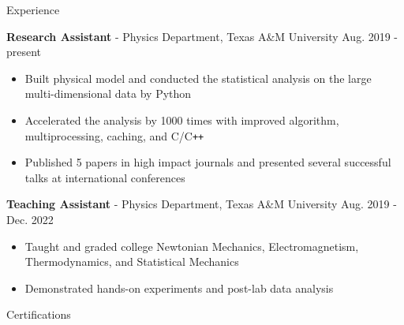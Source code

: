 \documentclass{resume}
\begin{document}
\begin{rSection}{Experience}
    \item \textbf{Research Assistant} - Physics Department, Texas A\&M University \hfill Aug. 2019 - present
        \begin{itemize}
        \item Built physical model and conducted the statistical analysis on the large multi-dimensional data by Python
        \item Accelerated the analysis by 1000 times with improved algorithm, multiprocessing, caching, and C/C\texttt{++}
        \item Published 5 papers in high impact journals and presented several successful talks at international conferences
        \end{itemize}

    \item \textbf{Teaching Assistant} - Physics Department, Texas A\&M University \hfill Aug. 2019 - Dec. 2022
        \begin{itemize}
        \item Taught and graded college Newtonian Mechanics, Electromagnetism, Thermodynamics, and Statistical Mechanics
        \item Demonstrated hands-on experiments and post-lab data analysis
        \end{itemize}
\end{rSection}

\vspace{-0.25em}
\begin{rSection}{Certifications}
    \vspace{-1.2em}
    \item \href{https://www.coursera.org/account/accomplishments/verify/N4T4JR8XLU3Z}{\color{black}{~~~-~~Machine Learning Foundations: Algorithmic Foundations}} \vspace{-0.5em}
    \item \href{https://www.coursera.org/account/accomplishments/verify/4X4TD24NFAY4}{\color{black}{~~~-~~Machine Learning Foundations: Mathematical Foundations}} \vspace{-0.5em}
    \item \href{https://www.coursera.org/account/accomplishments/verify/TJKKSPN42ZEE}{\color{black}{~~~-~~Machine Learning Techniques}} \vspace{-0.5em}
    \item \href{https://www.coursera.org/account/accomplishments/verify/KHCRSS4J4TZE}{\color{black}{~~~-~~Divide and Conquer, Sorting and Searching, and Randomized Algorithms}} \vspace{-0.5em}
    \item \href{https://www.coursera.org/account/accomplishments/verify/5B7WBDL9BHVF}{\color{black}{~~~-~~A Crash Course in Causality: Inferring Causal Effects from Observational Data}}  \vspace{-0.5em}
\end{rSection}
\end{document}
